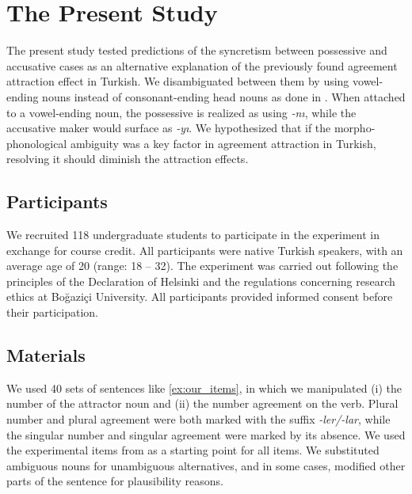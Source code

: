 \documentclass[times,linguex]{glossa}\usepackage[]{graphicx}\usepackage[]{color}
\begin{document}
\section{The Present Study}

The present study tested predictions of the syncretism between possessive and accusative cases as an alternative explanation of the previously found agreement attraction effect in Turkish. We disambiguated between them by using vowel-ending nouns instead of consonant-ending head nouns as done in \citet{LagoEtAl:2018}. When attached to a vowel-ending noun, the possessive is realized as using \textit{-nı}, while the accusative maker would surface as \textit{-yı}. We hypothesized that if the morpho-phonological ambiguity was a key factor in agreement attraction in Turkish, resolving it should diminish the attraction effects.

\subsection{Participants} 

We recruited 118 undergraduate students to participate in the experiment in exchange for course credit. All participants were native Turkish speakers, with an average age of 20 (range: 18 -- 32). The experiment was carried out following the principles of the Declaration of Helsinki and the regulations concerning research ethics at Boğaziçi University. All participants provided informed consent before their participation.



\subsection{Materials}

We used 40 sets of sentences like \ref{ex:our_items}, in which we manipulated (i) the number of the attractor noun and (ii) the number agreement on the verb. Plural number and plural agreement were both marked with the suffix \textit{-ler/-lar}, while the singular number and singular agreement were marked by its absence. We used the experimental items from \citet{LagoEtAl:2018} as a starting point for all items. We substituted ambiguous nouns for unambiguous alternatives, and in some cases, modified other parts of the sentence for plausibility reasons.
\end{document}
